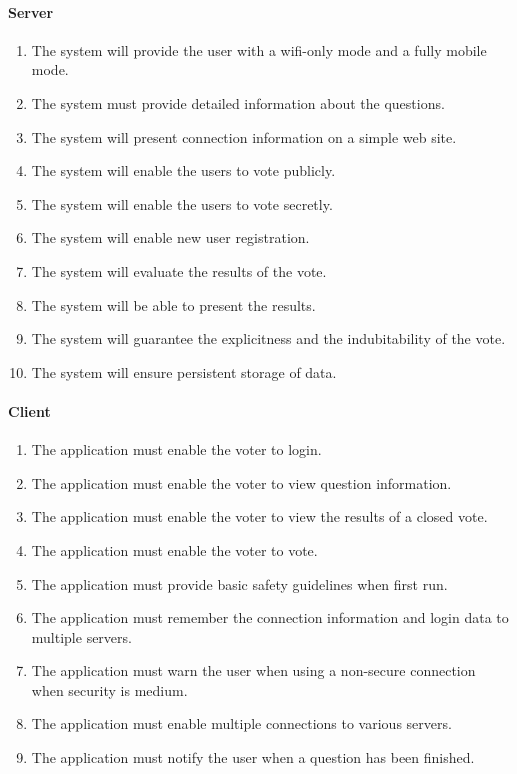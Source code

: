 \documentclass[11pt,twoside,a4paper]{book}
\begin{document}
\paragraph*{Server}

\begin{enumerate}

\item  The system will provide the user with a wifi-only mode and a fully mobile mode.
\item  The system must provide detailed information about the questions.
\item  The system will present connection information on a simple web site.
\item  The system will enable the users to vote publicly. \cite{bakalarkaJV}
\item  The system will enable the users to vote secretly. \cite{bakalarkaJV}
\item  The system will enable new user registration. \cite{bakalarkaJV}
\item The system will evaluate the results of the vote.\cite{bakalarkaJV}
\item The system will be able to present the results.\cite{bakalarkaJV}
\item The system will guarantee the explicitness and the indubitability of the vote. \cite{bakalarkaJV}
\item The system will ensure persistent storage of data. \cite{bakalarkaJV}
\end{enumerate}
\paragraph*{Client}
\begin{enumerate}
\item The application must enable the voter to login. 
\item The application must enable the voter to view question information.
\item The application must enable the voter to view the results of a closed vote. 
\item The application must enable the voter to vote.
\item The application must provide basic safety guidelines when first run.
\item The application must remember the connection information and login data to multiple servers.
\item The application must warn the user when using a non-secure connection when security is medium.
\item The application must enable multiple connections to various servers.
\item The application must notify the user when a question has been finished.
\end{enumerate}
\end{document}
